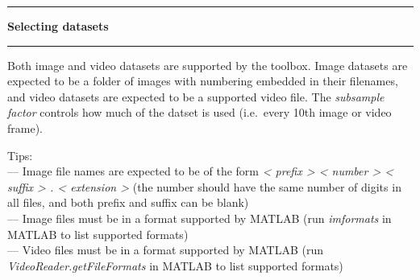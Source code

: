 \noindent\rule{\textwidth}{1pt}
\indent \textbf{Selecting datasets}
\noindent\rule{\textwidth}{1pt}
\smallskip
\parbox{\textwidth}{Both image and video datasets are supported by the toolbox. Image datasets are expected to be a folder of images with numbering embedded in their filenames, and video datasets are expected to be a supported video file. The \textit{subsample factor} controls how much of the datset is used (i.e.\ every 10th image or video frame).}
\bigskip
\parbox{\textwidth}{Tips: \\ --- Image file names are expected to be of the form \textit{\textless{} prefix \textgreater{} \textless{} number \textgreater{} \textless{} suffix \textgreater{} . \textless{} extension \textgreater{}} (the number should have the same number of digits in all files, and both prefix and suffix can be blank) \\ --- Image files must be in a format supported by MATLAB (run \textit{imformats} in MATLAB to list supported formats) \\ --- Video files must be in a format supported by MATLAB (run \textit{VideoReader.getFileFormats} in MATLAB to list supported formats)}
\smallskip
